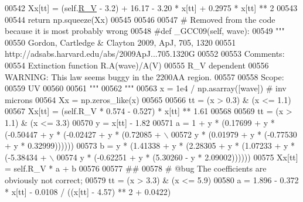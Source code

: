 \begin{DoxyCode}
00542         Xx[tt] = (self.\hyperlink{classpyneb_1_1extinction_1_1red__corr_1_1_red_corr_a4696ecdd84c912c20e6aa19b1573e875}{R\_V} - 3.2) + 16.17 - 3.20 * x[tt] + 0.2975 * x[tt] ** 2
00543  
00544         \textcolor{keywordflow}{return} np.squeeze(Xx)
00545     
00546     
00547     \textcolor{comment}{# Removed from the code because it is most probably wrong}
00548     \textcolor{comment}{#def \_GCC09(self, wave):}
00549         \textcolor{stringliteral}{"""}
00550 \textcolor{stringliteral}{        Gordon, Cartledge & Clayton 2009, ApJ, 705, 1320}
00551 \textcolor{stringliteral}{        http://adsabs.harvard.edu/abs/2009ApJ...705.1320G}
00552 \textcolor{stringliteral}{        }
00553 \textcolor{stringliteral}{        Comments:}
00554 \textcolor{stringliteral}{        Extinction function R.A(wave)/A(V) }
00555 \textcolor{stringliteral}{        R\_V dependent}
00556 \textcolor{stringliteral}{        WARNING: This law seems buggy in the 2200AA region.}
00557 \textcolor{stringliteral}{        }
00558 \textcolor{stringliteral}{        Scope:}
00559 \textcolor{stringliteral}{        UV}
00560 \textcolor{stringliteral}{           }
00561 \textcolor{stringliteral}{        """}
00562         \textcolor{stringliteral}{"""}
00563 \textcolor{stringliteral}{        x = 1e4 / np.asarray([wave]) # inv microns}
00564 \textcolor{stringliteral}{        Xx = np.zeros\_like(x)}
00565 \textcolor{stringliteral}{}
00566 \textcolor{stringliteral}{        tt = (x > 0.3) & (x <= 1.1)}
00567 \textcolor{stringliteral}{        Xx[tt] = (self.R\_V * 0.574 - 0.527) * x[tt] ** 1.61}
00568 \textcolor{stringliteral}{        }
00569 \textcolor{stringliteral}{        tt = (x > 1.1) & (x <= 3.3)}
00570 \textcolor{stringliteral}{        y = x[tt] - 1.82}
00571 \textcolor{stringliteral}{        a = 1 + y * (0.17699 + y * (-0.50447 + y * (-0.02427 + y * (0.72085 + \(\backslash\)}
00572 \textcolor{stringliteral}{                y * (0.01979 + y * (-0.77530 + y * 0.32999))))))}
00573 \textcolor{stringliteral}{        b = y * (1.41338 + y * (2.28305 + y * (1.07233 + y * (-5.38434 + \(\backslash\)}
00574 \textcolor{stringliteral}{            y * (-0.62251 + y * (5.30260 - y * 2.09002)))))) }
00575 \textcolor{stringliteral}{        Xx[tt] = self.R\_V * a + b}
00576 \textcolor{stringliteral}{}
00577 \textcolor{stringliteral}{        ##}
00578 \textcolor{stringliteral}{        # @bug The coefficients are obviously not correct; }
00579 \textcolor{stringliteral}{        tt = (x > 3.3) & (x <= 5.9)}
00580 \textcolor{stringliteral}{        a = 1.896 - 0.372 * x[tt] - 0.0108 / ((x[tt] - 4.57) ** 2 + 0.0422)}

\end{DoxyCode}
